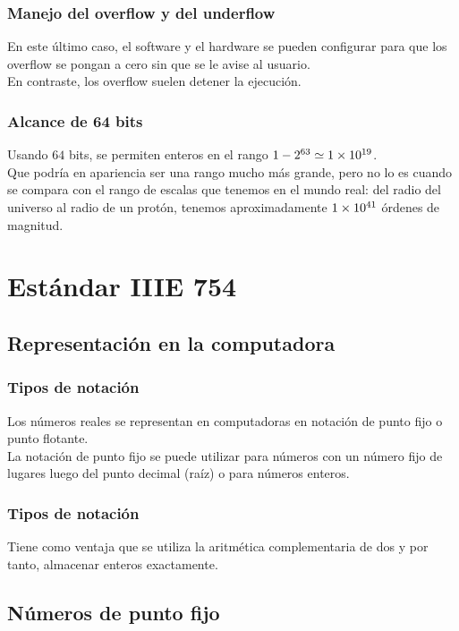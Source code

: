 \documentclass[12pt]{beamer}
\begin{document}
\begin{frame}
\frametitle{Manejo del overflow y del underflow}
En este último caso, el software y el hardware se pueden configurar para que los overflow se pongan a cero sin que se le avise al usuario.
\\
\bigskip
\pause
En contraste, los overflow suelen detener la ejecución.
\end{frame}
\begin{frame}
\frametitle{Alcance de 64 bits}
Usando $64$ bits, se permiten enteros en el rango $1 - 2^{63} \simeq \num{1d19}$.
\\
\bigskip
\pause
Que podría en apariencia ser una rango mucho más grande, pero no lo es cuando se compara con el rango de escalas que tenemos en el mundo real: del radio del universo al radio de un protón, tenemos aproximadamente $\num{1d41}$ órdenes de magnitud.
\end{frame}

\section{Estándar IIIE 754}
\subsection{Representación en la computadora}

\begin{frame}
\frametitle{Tipos de notación}
Los números reales se representan en computadoras en notación de punto fijo o punto flotante.
\\
\bigskip
\pause
La notación de punto fijo se puede utilizar para números con un número fijo de lugares luego del punto decimal (raíz) o para números enteros.
\end{frame}
\begin{frame}
\frametitle{Tipos de notación}
Tiene como ventaja que se utiliza la aritmética complementaria de dos y por tanto, almacenar enteros exactamente.
\end{frame}

\subsection{Números de punto fijo}
\end{document}

